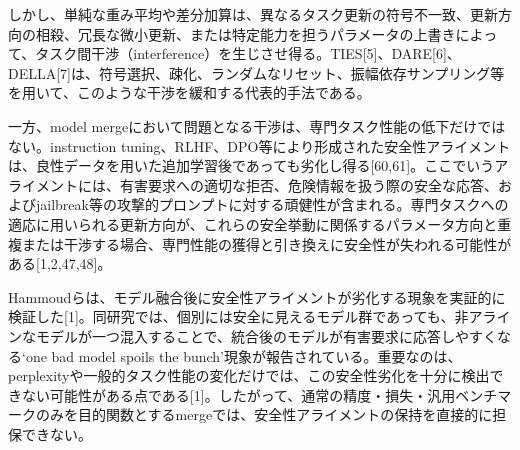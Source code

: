 \documentclass{article}
\begin{document}
しかし、単純な重み平均や差分加算は、異なるタスク更新の符号不一致、更新方向の相殺、冗長な微小更新、または特定能力を担うパラメータの上書きによって、タスク間干渉（interference）を生じさせ得る。TIES[5]、DARE[6]、DELLA[7]は、符号選択、疎化、ランダムなリセット、振幅依存サンプリング等を用いて、このような干渉を緩和する代表的手法である。

一方、model mergeにおいて問題となる干渉は、専門タスク性能の低下だけではない。instruction tuning、RLHF、DPO等により形成された安全性アライメントは、良性データを用いた追加学習後であっても劣化し得る[60,61]。ここでいうアライメントには、有害要求への適切な拒否、危険情報を扱う際の安全な応答、およびjailbreak等の攻撃的プロンプトに対する頑健性が含まれる。専門タスクへの適応に用いられる更新方向が、これらの安全挙動に関係するパラメータ方向と重複または干渉する場合、専門性能の獲得と引き換えに安全性が失われる可能性がある[1,2,47,48]。

Hammoudらは、モデル融合後に安全性アライメントが劣化する現象を実証的に検証した[1]。同研究では、個別には安全に見えるモデル群であっても、非アラインなモデルが一つ混入することで、統合後のモデルが有害要求に応答しやすくなる`one bad model spoils the bunch'現象が報告されている。重要なのは、perplexityや一般的タスク性能の変化だけでは、この安全性劣化を十分に検出できない可能性がある点である[1]。したがって、通常の精度・損失・汎用ベンチマークのみを目的関数とするmergeでは、安全性アライメントの保持を直接的に担保できない。



\end{document}
